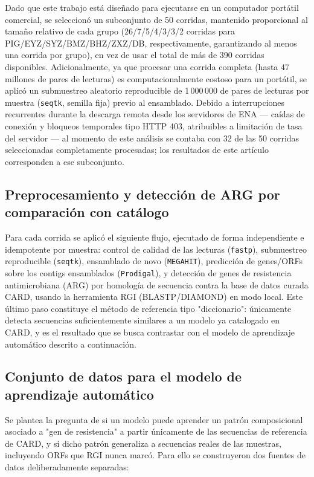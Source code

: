 \documentclass[journal]{vgtc}                     %
\begin{document}
Dado que este trabajo está diseñado para ejecutarse en un computador portátil comercial, se seleccionó un subconjunto de 50 corridas, mantenido proporcional al tamaño relativo de cada grupo (26/7/5/4/3/3/2 corridas para PIG/EYZ/SYZ/BMZ/BHZ/ZXZ/DB, respectivamente, garantizando al menos una corrida por grupo), en vez de usar el total de más de 390 corridas disponibles. Adicionalmente, ya que procesar una corrida completa (hasta 47 millones de pares de lecturas) es computacionalmente costoso para un portátil, se aplicó un submuestreo aleatorio reproducible de 1\,000\,000 de pares de lecturas por muestra (\texttt{seqtk}, semilla fija) previo al ensamblado. Debido a interrupciones recurrentes durante la descarga remota desde los servidores de ENA --- caídas de conexión y bloqueos temporales tipo HTTP 403, atribuibles a limitación de tasa del servidor --- al momento de este análisis se contaba con 32 de las 50 corridas seleccionadas completamente procesadas; los resultados de este artículo corresponden a ese subconjunto.

\subsection{Preprocesamiento y detección de ARG por comparación con catálogo}

Para cada corrida se aplicó el siguiente flujo, ejecutado de forma independiente e idempotente por muestra: control de calidad de las lecturas (\texttt{fastp}), submuestreo reproducible (\texttt{seqtk}), ensamblado de novo (\texttt{MEGAHIT}), predicción de genes/ORFs sobre los contigs ensamblados (\texttt{Prodigal}), y detección de genes de resistencia antimicrobiana (ARG) por homología de secuencia contra la base de datos curada CARD, usando la herramienta RGI (BLASTP/DIAMOND) en modo local. Este último paso constituye el método de referencia tipo "diccionario": únicamente detecta secuencias suficientemente similares a un modelo ya catalogado en CARD, y es el resultado que se busca contrastar con el modelo de aprendizaje automático descrito a continuación.

\subsection{Conjunto de datos para el modelo de aprendizaje automático}
\label{sec:dataset_ml}

Se plantea la pregunta de si un modelo puede aprender un patrón composicional asociado a "gen de resistencia" a partir únicamente de las secuencias de referencia de CARD, y si dicho patrón generaliza a secuencias reales de las muestras, incluyendo ORFs que RGI nunca marcó. Para ello se construyeron dos fuentes de datos deliberadamente separadas:
\end{document}
